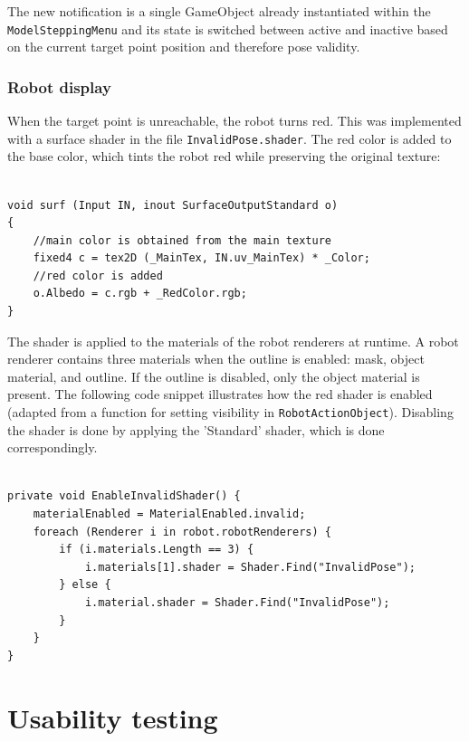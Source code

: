 The new notification is a single GameObject already instantiated within the \texttt{ModelSteppingMenu} and its state is switched between active and inactive based on the current target point position and therefore pose validity. 

\subsection{Robot display}

When the target point is unreachable, the robot turns red. This was implemented with a surface shader in the file \texttt{InvalidPose.shader}. The red color is added to the base color, which tints the robot red while preserving the original texture:

\begin{lstlisting}[style=sharpc]

void surf (Input IN, inout SurfaceOutputStandard o)
{
    //main color is obtained from the main texture
    fixed4 c = tex2D (_MainTex, IN.uv_MainTex) * _Color;
    //red color is added
    o.Albedo = c.rgb + _RedColor.rgb;
}
\end{lstlisting}

The shader is applied to the materials of the robot renderers at runtime. A robot renderer contains three materials when the outline is enabled: mask, object material, and outline. If the outline is disabled, only the object material is present. The following code snippet illustrates how the red shader is enabled (adapted from a function for setting visibility in  \texttt{RobotActionObject}). Disabling the shader is done by applying the 'Standard' shader, which is done correspondingly.

\begin{lstlisting}[style=sharpc]

private void EnableInvalidShader() {
    materialEnabled = MaterialEnabled.invalid;
    foreach (Renderer i in robot.robotRenderers) {
        if (i.materials.Length == 3) {
            i.materials[1].shader = Shader.Find("InvalidPose");
        } else {
            i.material.shader = Shader.Find("InvalidPose");
        }
    }
}
\end{lstlisting}


\chapter{Usability testing}

